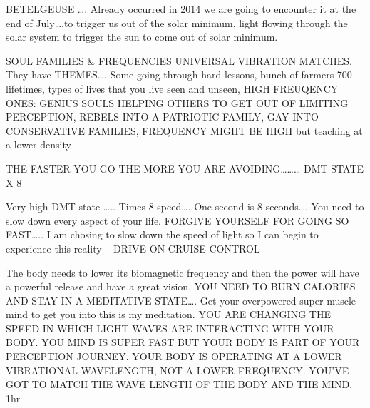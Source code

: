 BETELGEUSE \ldots{}. Already occurred in 2014 we are going to encounter
it at the end of July\ldots{}.to trigger us out of the solar minimum,
light flowing through the solar system to trigger the sun to come out of
solar minimum.

SOUL FAMILIES \& FREQUENCIES UNIVERSAL VIBRATION MATCHES. They have
THEMES\ldots{}. Some going through hard lessons, bunch of farmers 700
lifetimes, types of lives that you live seen and unseen, HIGH FREUQENCY
ONES: GENIUS SOULS HELPING OTHERS TO GET OUT OF LIMITING PERCEPTION,
REBELS INTO A PATRIOTIC FAMILY, GAY INTO CONSERVATIVE FAMILIES,
FREQUENCY MIGHT BE HIGH but teaching at a lower density

THE FASTER YOU GO THE MORE YOU ARE AVOIDING\ldots{}\ldots{}\ldots{} DMT
STATE X 8

Very high DMT state \ldots{}.. Times 8 speed\ldots{}. One second is 8
seconds\ldots{}. You need to slow down every aspect of your life.
FORGIVE YOURSELF FOR GOING SO FAST\ldots{}.. I am chosing to slow down
the speed of light so I can begin to experience this reality -- DRIVE ON
CRUISE CONTROL

The body needs to lower its biomagnetic frequency and then the power
will have a powerful release and have a great vision. YOU NEED TO BURN
CALORIES AND STAY IN A MEDITATIVE STATE\ldots{}. Get your overpowered
super muscle mind to get you into this is my meditation. YOU ARE
CHANGING THE SPEED IN WHICH LIGHT WAVES ARE INTERACTING WITH YOUR BODY.
YOU MIND IS SUPER FAST BUT YOUR BODY IS PART OF YOUR PERCEPTION JOURNEY.
YOUR BODY IS OPERATING AT A LOWER VIBRATIONAL WAVELENGTH, NOT A LOWER
FREQUENCY. YOU'VE GOT TO MATCH THE WAVE LENGTH OF THE BODY AND THE MIND.
1hr
